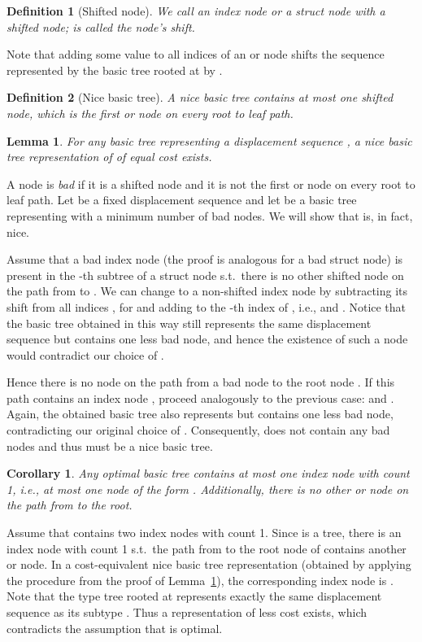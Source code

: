\documentclass[a4paper,11pt]{article}
\newtheorem{definition}{Definition}
\newtheorem{lemma}{Lemma}
\newtheorem{corollary}{Corollary}
\newenvironment{proof}{\par\noindent{\textsc{Proof:}}\space}{\protect\\ \par}
\begin{document}
\begin{definition}[Shifted node]
We call an index node  or a struct node  with  a
\emph{shifted node};  is called the node's \emph{shift}.
\end{definition}
Note that adding some value  to all indices of an  or 
node  shifts the sequence represented by the basic tree rooted at
 by .

\begin{definition}[Nice basic tree]
\label{def:nicetree}
A \emph{nice basic tree} contains at most one shifted node, which is the first  or  node on every root to leaf path.
\end{definition}

\begin{lemma}
\label{lemma:niceTypeTree}
For any basic tree  representing a displacement sequence , a
nice basic tree representation  of  of equal cost
exists.
\end{lemma}
\begin{proof}
A node is \emph{bad} if it is a shifted node and it is not the first
 or  node on every root to leaf path.  Let  be a fixed
displacement sequence and let  be a basic tree representing 
with a minimum number of bad nodes. We will show that  is, in fact,
nice.

Assume that a bad index node (the proof is analogous for a bad struct
node)  is present in the -th subtree of a struct node
 s.t.\ there is no other
shifted node on the path from  to .  We can change  to
a non-shifted index node by subtracting its shift  from all
indices , for  and adding  to the -th index
 of , i.e.,  and . Notice that the basic tree obtained in
this way still represents the same displacement sequence  but
contains one less bad node, and hence the existence of such a node
 would contradict our choice of .
    
Hence there is no  node on the path from a bad node  to
the root node .  If this path contains an index node , proceed analogously to the previous case: 
and . Again, the obtained basic tree also represents
 but contains one less bad node, contradicting our original choice
of . Consequently,  does not contain any bad nodes and thus must
be a nice basic tree.
\end{proof}

\begin{corollary}
\label{corollary:atMostOneIndexWithCount1}
Any optimal basic tree  contains at most one index node with count
1, i.e., at most one node of the form . Additionally, there is no other  or
 node on the path from  to the root.
\end{corollary}
\begin{proof}
Assume that  contains two index nodes with count 1.  Since  is a
tree, there is an index node  with count 1 s.t.\ the path from 
to the root node of  contains another  or  node.  In a
cost-equivalent nice basic tree representation  (obtained
by applying the procedure from the proof of
Lemma~\ref{lemma:niceTypeTree}), the corresponding index node is
.  Note that the type tree rooted at
 represents exactly the same displacement sequence as its
subtype . Thus a representation  of less cost exists, which
contradicts the assumption that  is optimal.
\end{proof}
\end{document}
